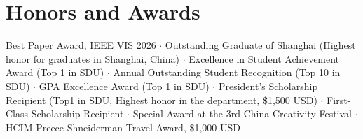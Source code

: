 \section{Honors and Awards}
    \begin{itemize}[leftmargin=0.15in, label={}]
	\small{\item{
		Best Paper Award, IEEE VIS 2026 $\cdot$ Outstanding Graduate of Shanghai (Highest honor for graduates in Shanghai, China) $\cdot$ Excellence in Student Achievement Award (Top 1 in SDU) $\cdot$ Annual Outstanding Student Recognition (Top 10 in SDU) $\cdot$ GPA Excellence Award (Top 1 in SDU) $\cdot$ President's Scholarship Recipient (Top1 in SDU, Highest honor in the department, \$1,500 USD) $\cdot$ First-Class Scholarship Recipient $\cdot$ Special Award at the 3rd China Creativity Festival $\cdot$ HCIM Preece-Shneiderman Travel Award, \$1,000 USD
	}}
    \end{itemize}
